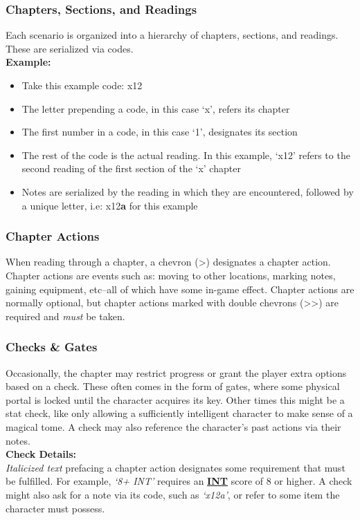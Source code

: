 \documentclass[12pt]{article}
\newcommand{\refto}[1]{\hyperlink{#1}{\textbf{#1}}}
\begin{document}
\begin{multicols*}{2}
\subsubsection{Chapters, Sections, and Readings}
Each scenario is organized into a hierarchy of chapters, sections, and readings. These are serialized via codes.\\
\textbf{Example:}
\begin{itemize}
\item Take this example code: x12
\item The letter prepending a code, in this case ‘x’, refers its chapter
\item The first number in a code, in this case ‘1’, designates its section
\item The rest of the code is the actual reading. In this example, ‘x12’ refers to the second reading of the first section of the ‘x’ chapter
\item Notes are serialized by the reading in which they are encountered, followed by a unique letter, i.e: x12\textbf{a} for this example
\end{itemize}

\columnbreak

\subsubsection{Chapter Actions}
When reading through a chapter, a chevron (>) designates a chapter action. Chapter actions are events such as: moving to other locations, marking notes, gaining equipment, etc--all of which have some in-game effect. Chapter actions are normally optional, but chapter actions marked with double chevrons (>>) are required and \emph{must} be taken.

\subsubsection{Checks \& Gates}
Occasionally, the chapter may restrict progress or grant the player extra options based on a check. These often comes in the form of gates, where some physical portal is locked until the character acquires its key. Other times this might be a stat check, like only allowing a sufficiently intelligent character to make sense of a magical tome. A check may also reference the character’s past actions via their notes.\\

\textbf{Check Details:}\\
\emph{Italicized text} prefacing a chapter action designates some requirement that must be fulfilled. For example, \emph{‘8+ INT’} requires an \refto{INT} score of 8 or higher. A check might also ask for a note via its code, such as \emph{‘x12a’}, or refer to some item the character must possess.\\


\end{multicols*}
\end{document}
